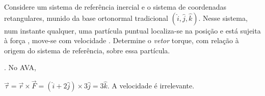 \begin{question}
    Considere um sistema de referência inercial e o sistema de coordenadas retangulares, munido da base ortonormal tradicional $(\hat i, \hat j, \hat k)$.
    Nesse sistema, num instante qualquer, uma partícula puntual localiza-se na posição  e está sujeita à força , move-se com velocidade .
    Determine o \emph{vetor} torque, com relação à origem do sistema de referência, sobre essa partícula.

    \begin{answer}
      . No AVA, 
    \end{answer}
    
    \begin{solution}
      $\vec\tau = \vec r \times \vec F = (\hat i + 2\hat j) \times 3\hat j = 3 \hat k$.
      A velocidade é irrelevante.
    \end{solution}
\end{question}